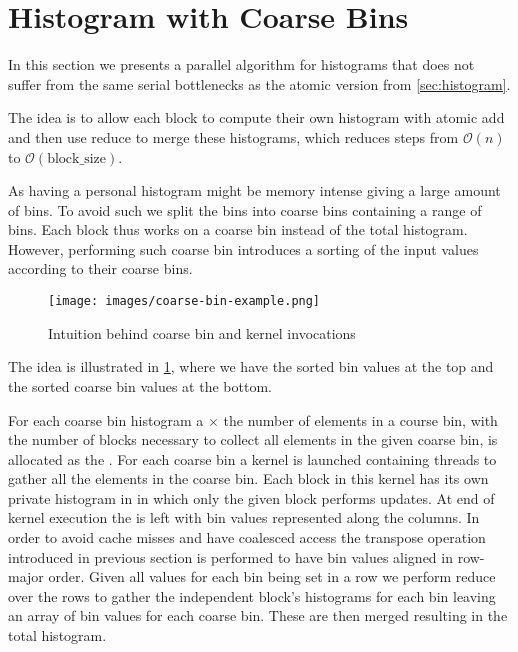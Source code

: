 \section{Histogram with Coarse Bins}
\label{sec:coarse bin histogram}

In this section we presents a parallel algorithm for histograms that does not suffer from the same serial bottlenecks as the atomic version from \cref{sec:histogram}.

The idea is to allow each block to compute their own histogram with atomic add and then use reduce to merge these histograms, which reduces steps from $\mathcal{O}(n)$ to $\mathcal{O}(\mathrm{block\_size})$.

As having a personal histogram might be memory intense giving a large amount of bins.
To avoid such we split the bins into coarse bins containing a range of bins.
Each block thus works on a coarse bin instead of the total histogram.
However, performing such coarse bin introduces a sorting of the input values according to their coarse bins.

\begin{figure}[htb]
  \centering
  \texttt{[image: images/coarse-bin-example.png]}
  \caption{Intuition behind coarse bin and kernel invocations}
  \label{fig:coarse bins example}
\end{figure}

The idea is illustrated in \cref{fig:coarse bins example}, where we have the sorted bin values at the top and the sorted coarse bin values at the bottom.

For each coarse bin histogram a  $\times$ the number of elements in a course bin, with  the number of blocks necessary to collect all elements in the given coarse bin, is allocated as the .
For each coarse bin a kernel is launched containing threads to gather all the elements in the coarse bin.
Each block in this kernel has its own private histogram in  in which only the given block performs updates.
At end of kernel execution the  is left with bin values represented along the columns.
In order to avoid cache misses and have coalesced access the transpose operation introduced in previous section is performed to have bin values aligned in row-major order. Given all values for each bin being set in a row we perform reduce over the rows to gather the independent block's histograms for each bin leaving an array of bin values for each coarse bin.
These are then merged resulting in the total histogram.

